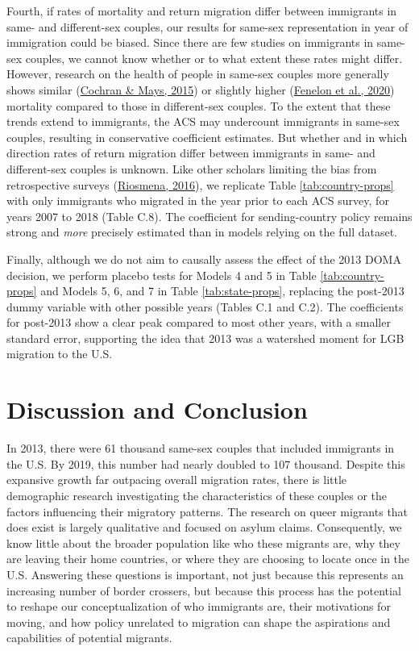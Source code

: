 \documentclass[
  12pt,
]{article}
\begin{document}
Fourth, if rates of mortality and return migration differ between immigrants in same- and different-sex couples, our results for same-sex representation in year of immigration could be biased. Since there are few studies on immigrants in same-sex couples, we cannot know whether or to what extent these rates might differ. However, research on the health of people in same-sex couples more generally shows similar (\protect\hyperlink{ref-cochran_2015_mortality}{Cochran \& Mays, 2015}) or slightly higher (\protect\hyperlink{ref-fenelon_2020_samesex}{Fenelon et al., 2020}) mortality compared to those in different-sex couples. To the extent that these trends extend to immigrants, the ACS may undercount immigrants in same-sex couples, resulting in conservative coefficient estimates. But whether and in which direction rates of return migration differ between immigrants in same- and different-sex couples is unknown. Like other scholars limiting the bias from retrospective surveys (\protect\hyperlink{ref-riosmena_2016_potential}{Riosmena, 2016}), we replicate Table \ref{tab:country-props} with only immigrants who migrated in the year prior to each ACS survey, for years 2007 to 2018 (Table C.8). The coefficient for sending-country policy remains strong and \emph{more} precisely estimated than in models relying on the full dataset.

Finally, although we do not aim to causally assess the effect of the 2013 DOMA decision, we perform placebo tests for Models 4 and 5 in Table \ref{tab:country-props} and Models 5, 6, and 7 in Table \ref{tab:state-props}, replacing the post-2013 dummy variable with other possible years (Tables C.1 and C.2). The coefficients for post-2013 show a clear peak compared to most other years, with a smaller standard error, supporting the idea that 2013 was a watershed moment for LGB migration to the U.S.

\hypertarget{discussion-and-conclusion}{%
\section{Discussion and Conclusion}\label{discussion-and-conclusion}}

In 2013, there were 61 thousand same-sex couples that included immigrants in the U.S. By 2019, this number had nearly doubled to 107 thousand. Despite this expansive growth far outpacing overall migration rates, there is little demographic research investigating the characteristics of these couples or the factors influencing their migratory patterns. The research on queer migrants that does exist is largely qualitative and focused on asylum claims. Consequently, we know little about the broader population like who these migrants are, why they are leaving their home countries, or where they are choosing to locate once in the U.S. Answering these questions is important, not just because this represents an increasing number of border crossers, but because this process has the potential to reshape our conceptualization of who immigrants are, their motivations for moving, and how policy unrelated to migration can shape the aspirations and capabilities of potential migrants.
\end{document}
